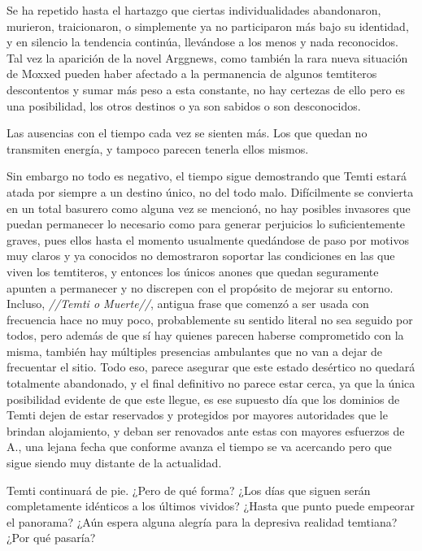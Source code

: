\documentclass[
  spanish,
]{book}
\begin{document}
Se ha repetido hasta el hartazgo que ciertas individualidades abandonaron, murieron, traicionaron, o simplemente ya no participaron más bajo su identidad, y en silencio la tendencia continúa, llevándose a los menos y nada reconocidos.\\
Tal vez la aparición de la novel Arggnews, como también la rara nueva situación de Moxxed pueden haber afectado a la permanencia de algunos temtiteros descontentos y sumar más peso a esta constante, no hay certezas de ello pero es una posibilidad, los otros destinos o ya son sabidos o son desconocidos.

Las ausencias con el tiempo cada vez se sienten más. Los que quedan no transmiten energía, y tampoco parecen tenerla ellos mismos.

Sin embargo no todo es negativo, el tiempo sigue demostrando que Temti estará atada por siempre a un destino único, no del todo malo. Difícilmente se convierta en un total basurero como alguna vez se mencionó, no hay posibles invasores que puedan permanecer lo necesario como para generar perjuicios lo suficientemente graves, pues ellos hasta el momento usualmente quedándose de paso por motivos muy claros y ya conocidos no demostraron soportar las condiciones en las que viven los temtiteros, y entonces los únicos anones que quedan seguramente apunten a permanecer y no discrepen con el propósito de mejorar su entorno.\\
Incluso, \emph{//Temti o Muerte//}, antigua frase que comenzó a ser usada con frecuencia hace no muy poco, probablemente su sentido literal no sea seguido por todos, pero además de que sí hay quienes parecen haberse comprometido con la misma, también hay múltiples presencias ambulantes que no van a dejar de frecuentar el sitio. Todo eso, parece asegurar que este estado desértico no quedará totalmente abandonado, y el final definitivo no parece estar cerca, ya que la única posibilidad evidente de que este llegue, es ese supuesto día que los dominios de Temti dejen de estar reservados y protegidos por mayores autoridades que le brindan alojamiento, y deban ser renovados ante estas con mayores esfuerzos de A., una lejana fecha que conforme avanza el tiempo se va acercando pero que sigue siendo muy distante de la actualidad.

Temti continuará de pie. ¿Pero de qué forma? ¿Los días que siguen serán completamente idénticos a los últimos vividos? ¿Hasta que punto puede empeorar el panorama? ¿Aún espera alguna alegría para la depresiva realidad temtiana? ¿Por qué pasaría?
\end{document}
